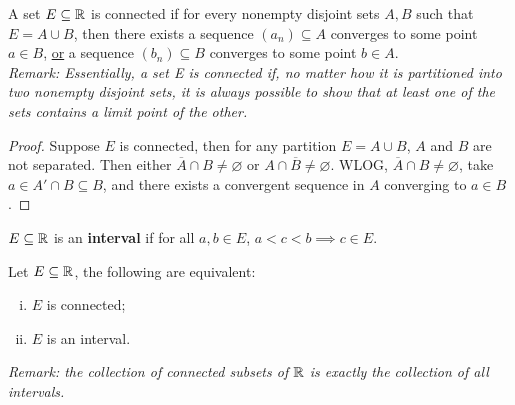 \documentclass[11pt]{article}
\begin{document}
	\begin{theorem}
		A set $E \subseteq \mathbb{R}$ is connected if for every nonempty disjoint sets $A, B$ such that $E = A \cup B$, then there exists a sequence $(a_n) \subseteq A$ converges to some point $a \in B$, \ul{or} a sequence $(b_n) \subseteq B$ converges to some point $b \in A$. \\
		\emph{Remark: Essentially, a set E is connected if, no matter how it is partitioned into two nonempty disjoint sets, it is always possible to show that at least one of the sets contains a limit point of the other.}
	\end{theorem}
	
	\begin{proof}
		Suppose $E$ is connected, then for any partition $E = A \cup B$, $A$ and $B$ are not separated. Then either $\overline{A} \cap B \neq \varnothing$ or $A \cap \overline{B} \neq \varnothing$. WLOG, $\overline{A} \cap B \neq \varnothing$, take $a \in A' \cap B \subseteq B$, and there exists a convergent sequence in $A$ converging to $a \in B$.
	\end{proof}
	
	\begin{definition}
		$E \subseteq \mathbb{R}$ is an \textbf{interval} if for all $a, b \in E$, $a < c < b \implies c \in E$.
	\end{definition}
	
	\begin{theorem}
		Let $E \subseteq \mathbb{R}$, the following are equivalent:
		\begin{enumerate}[(i)]
			\item $E$ is connected;
			\item $E$ is an interval.
		\end{enumerate}
		\emph{Remark: the collection of connected subsets of $\mathbb{R}$ is exactly the collection of all intervals.}
	\end{theorem}
	
\end{document}
